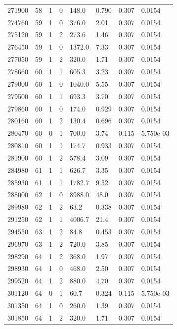 \documentclass[preview]{standalone}
\begin{document}
{{{{{{{{\begin{tabular}{L{1.2cm}C{1.2cm} C{0.3cm}C{0.5cm} C{1.4cm}C{1.4cm} C{1.4cm}C{1.4cm}}
  271900  &    58  & 1     &  0 &  148.0  & 0.790  & 0.307 &  0.0154   \\ 
  274760  &    59  & 1     &  0 &  376.0  & 2.01  & 0.307 &  0.0154   \\ 
  275120  &    59  & 1     &  2 &  273.6  & 1.46  & 0.307 &  0.0154   \\ 
  276450  &    59  & 1     &  0 &  1372.0  & 7.33  & 0.307 &  0.0154   \\ 
  277050  &    59  & 1     &  2 &  320.0  & 1.71  & 0.307 &  0.0154   \\ 
  278660  &    60  & 1     &  1 &  605.3  & 3.23  & 0.307 &  0.0154   \\ 
  279000  &    60  & 1     &  0 &  1040.0  & 5.55  & 0.307 &  0.0154   \\ 
  279500  &    60  & 1     &  1 &  693.3  & 3.70  & 0.307 &  0.0154   \\ 
  279860  &    60  & 1     &  0 &  174.0  & 0.929  & 0.307 &  0.0154   \\ 
  280160  &    60  & 1     &  2 &  130.4  & 0.696  & 0.307 &  0.0154   \\ 
  280470  &    60  & 0     &  1 &  700.0  & 3.74  & 0.115 &  5.750e-03   \\ 
  280810  &    60  & 1     &  1 &  174.7  & 0.933  & 0.307 &  0.0154   \\ 
  281900  &    60  & 1     &  2 &  578.4  & 3.09  & 0.307 &  0.0154   \\ 
  284980  &    61  & 1     &  1 &  626.7  & 3.35  & 0.307 &  0.0154   \\ 
  285930  &    61  & 1     &  1 &  1782.7  & 9.52  & 0.307 &  0.0154   \\ 
  288000  &    62  & 1     &  0 &  8988.0  & 48.0  & 0.307 &  0.0154   \\ 
  289980  &    62  & 1     &  2 &  63.2  & 0.338  & 0.307 &  0.0154   \\ 
  291250  &    62  & 1     &  1 &  4006.7  & 21.4  & 0.307 &  0.0154   \\ 
  294550  &    63  & 1     &  2 &  84.8  & 0.453  & 0.307 &  0.0154   \\ 
  296970  &    63  & 1     &  2 &  720.0  & 3.85  & 0.307 &  0.0154   \\ 
  298290  &    64  & 1     &  2 &  368.0  & 1.97  & 0.307 &  0.0154   \\ 
  298930  &    64  & 1     &  0 &  468.0  & 2.50  & 0.307 &  0.0154   \\ 
  299520  &    64  & 1     &  2 &  880.0  & 4.70  & 0.307 &  0.0154   \\ 
  301120  &    64  & 0     &  1 &  60.7  & 0.324  & 0.115 &  5.750e-03   \\ 
  301350  &    64  & 1     &  0 &  260.0  & 1.39  & 0.307 &  0.0154   \\ 
  301850  &    64  & 1     &  2 &  320.0  & 1.71  & 0.307 &  0.0154   \\ 
\hline 
\end{tabular} 

}}}}}}}}
\end{document}
